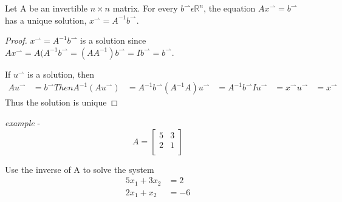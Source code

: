 \documentclass{article}
\begin{document}
Let A be an invertible $n{\times}n$ matrix. For every $b^{\rightharpoonup}\epsilon\mathbb{R}^n$, the equation $Ax^{\rightharpoonup}=b^{\rightharpoonup}$ has a unique solution, $x^{\rightharpoonup}=A^{-1}b^{\rightharpoonup}$.

\begin{proof}
$x^{\rightharpoonup}=A^{-1}b^{\rightharpoonup}$ is a solution since $Ax^{\rightharpoonup}=A(A^{-1}b^{\rightharpoonup}=(AA^{-1})b^{\rightharpoonup}=Ib^{\rightharpoonup}=b^{\rightharpoonup}$.

If $u^{\rightharpoonup}$ is a solution, then
\begin{align*}
Au^{\rightharpoonup} & =b^{\rightharpoonup}
Then A^{-1}(Au^{\rightharpoonup}) & =A^{-1}b^{\rightharpoonup}
(A^{-1}A)u^{\rightharpoonup} & =A^{-1}b^{\rightharpoonup}
Iu^{\rightharpoonup} & = x^{\rightharpoonup}
u^{\rightharpoonup} & =x^{\rightharpoonup}
\end{align*}
Thus the solution is unique
\end{proof}

\emph{example} -
\[ A=\left[ \begin{array}{cc}
                5 & 3 \\
                2 & 1 \\
       \end{array} \right]
\]

Use the inverse of A to solve the system
\begin{align*}
5x_1+3x_2 & =2\\
2x_1+x_2 & =-6
\end{align*}
\end{document}
